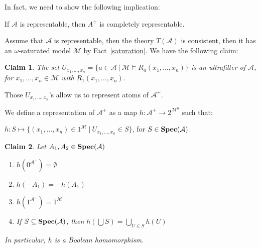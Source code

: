 \documentclass{article}
\theoremstyle{defin}
\theoremstyle{theorem}
\theoremstyle{claim}
\newtheorem{claim}{Claim}
\theoremstyle{prop}
\theoremstyle{lemma}
\theoremstyle{fact}
\theoremstyle{remark}
\theoremstyle{ex}
\theoremstyle{col}
\theoremstyle{question}
\begin{document}
In fact, we need to show the following implication:
\begin{center}
If $\mathcal{A}$ is representable, then $A^{+}$ is completely representable.
\end{center}

Assume that $\mathcal{A}$ is representable, then the theory $T(\mathcal{A})$ is consistent, then it has an $\omega$-saturated model $\mathcal{M}$ by Fact~\ref{saturation}. We have the following claim:
\begin{claim}
The set $U_{x_1,\dots,x_n} = \{ a \in \mathcal{A} \: | \: \mathcal{M} \models R_a(x_1,\dots,x_n)\}$ is an ultrafilter of $\mathcal{A}$, for $x_1,\dots,x_n \in \mathcal{M}$ with $R_{1}(x_1,\dots,x_n)$.
\end{claim}
Those $U_{x_1,\dots,x_n}$'s allow us to represent atoms of $\mathcal{A}^{+}$.

We define a representation of $\mathcal{A}^{+}$ as a map $h : \mathcal{A}^{+} \to 2^{\mathcal{M}^n}$ such that:
\begin{center}
$h : S \mapsto \{ (x_1, \dots, x_n) \in 1^{\mathcal{M}} \: | \: U_{x_1,\dots,x_n} \in S \}$, for $S \in {\bf Spec}(\mathcal{A})$.
\end{center}

\begin{claim} Let $A_1, A_2 \in {\bf Spec}(\mathcal{A})$
\begin{enumerate}
\item $h(0^{\mathcal{A}^{+}}) = \emptyset$
\item $h(- A_1) = - h(A_1)$
\item $h(1^{\mathcal{A}^{+}}) = 1^{\mathcal{M}}$
\item If $S \subseteq {\bf Spec}(\mathcal{A})$, then $h(\bigcup S) = \bigcup \limits_{U \in S} h(U)$
\end{enumerate}
In particular, $h$ is a Boolean homomorphism.
\end{claim}
\end{document}
